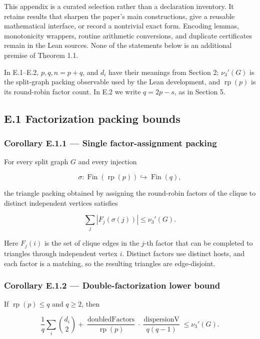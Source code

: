 \documentclass[english,11pt,a4paper]{article}
\begin{document}
This appendix is a curated selection rather than a declaration
inventory. It retains results that sharpen the paper's main
constructions, give a reusable mathematical interface, or record a
nontrivial exact form. Encoding lemmas, monotonicity wrappers, routine
arithmetic conversions, and duplicate certificates remain in the Lean
sources. None of the statements below is an additional premise of
Theorem 1.1.

In E.1--E.2, \(p,q,n=p+q\), and \(d_i\) have their meanings from Section
2; \(\nu_3'(G)\) is the split-graph packing observable used by the Lean
development, and \(\operatorname{rp}(p)\) is its round-robin factor
count. In E.2 we write \(q=2p-s\), as in Section 5.

\subsection{E.1 Factorization packing
bounds}\label{e.1-factorization-packing-bounds}

\subsubsection{Corollary E.1.1 --- Single factor-assignment
packing}\label{corollary-e.1.1-single-factor-assignment-packing}

For every split graph \(G\) and every injection

\[
\sigma:\operatorname{Fin}(\operatorname{rp}(p))\hookrightarrow \operatorname{Fin}(q),
\]

the triangle packing obtained by assigning the round-robin factors of
the clique to distinct independent vertices satisfies

\[
\sum_j |F_j(\sigma(j))|\le \nu_3'(G).
\]

Here \(F_j(i)\) is the set of clique edges in the \(j\)-th factor that
can be completed to triangles through independent vertex \(i\). Distinct
factors use distinct hosts, and each factor is a matching, so the
resulting triangles are edge-disjoint.

\subsubsection{Corollary E.1.2 --- Double-factorization lower
bound}\label{corollary-e.1.2-double-factorization-lower-bound}

If \(\operatorname{rp}(p)\le q\) and \(q\ge2\), then

\[
\frac1q\sum_i \binom{d_i}{2}
+
\frac{\operatorname{doubledFactors}}{\operatorname{rp}(p)}
\cdot
\frac{\operatorname{dispersionV}}{q(q-1)}
\le \nu_3'(G).
\]
\end{document}
